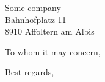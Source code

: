 \documentclass[
  fontsize=12pt,
  paper=a4,
  DIV=14,
  BCOR=5mm,
  pagenumber=footcenter,
  parskip=half*,
  german,
  SN
]{scrlttr2}
\begin{document}
\begin{letter}{Some company \\ Bahnhofplatz 11 \\ 8910 Affoltern am Albis}

  \opening{To whom it may concern,}

  \vspace{3\parskip}

  \lipsum[1-2]

  \vspace{3\parskip}

  \closing{Best regards,}
\end{letter}
\end{document}
